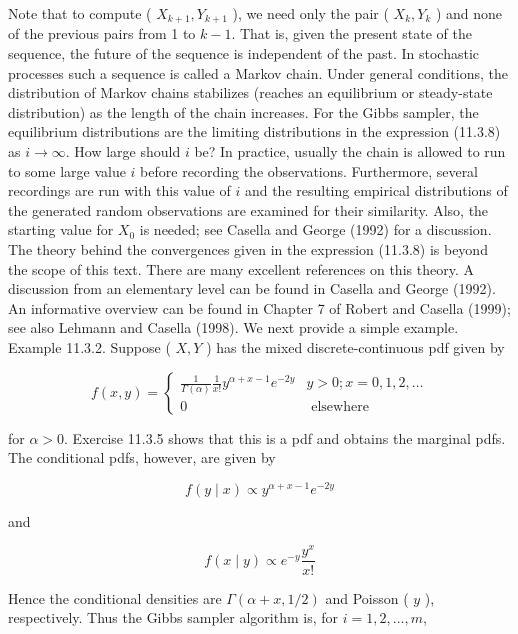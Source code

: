 Note that to compute ( $X_{k+1}, Y_{k+1}$ ), we need only the pair ( $X_{k}, Y_{k}$ ) and none of the previous pairs from 1 to $k-1$. That is, given the present state of the sequence, the future of the sequence is independent of the past. In stochastic processes such a sequence is called a Markov chain. Under general conditions, the distribution of Markov chains stabilizes (reaches an equilibrium or steady-state distribution) as the length of the chain increases. For the Gibbs sampler, the equilibrium distributions are the limiting distributions in the expression (11.3.8) as $i \rightarrow \infty$. How large should $i$ be? In practice, usually the chain is allowed to run to some large value $i$ before recording the observations. Furthermore, several recordings are run with this value of $i$ and the resulting empirical distributions of the generated random observations are examined for their similarity. Also, the starting value for $X_{0}$ is needed; see Casella and George (1992) for a discussion. The theory behind the convergences given in the expression (11.3.8) is beyond the scope of this text. There are many excellent references on this theory. A discussion from an elementary level can be found in Casella and George (1992). An informative overview can be found in Chapter 7 of Robert and Casella (1999); see also Lehmann and Casella (1998). We next provide a simple example.\\
Example 11.3.2. Suppose ( $X, Y$ ) has the mixed discrete-continuous pdf given by

\[
f(x, y)= \begin{cases}\frac{1}{\Gamma(\alpha)} \frac{1}{x!} y^{\alpha+x-1} e^{-2 y} & y>0 ; x=0,1,2, \ldots  \tag{11.3.10}\\ 0 & \text { elsewhere }\end{cases}
\]

for $\alpha>0$. Exercise 11.3.5 shows that this is a pdf and obtains the marginal pdfs. The conditional pdfs, however, are given by


\begin{equation*}
f(y \mid x) \propto y^{\alpha+x-1} e^{-2 y} \tag{11.3.11}
\end{equation*}


and


\begin{equation*}
f(x \mid y) \propto e^{-y} \frac{y^{x}}{x!} \tag{11.3.12}
\end{equation*}


Hence the conditional densities are $\Gamma(\alpha+x, 1 / 2)$ and Poisson ( $y$ ), respectively. Thus the Gibbs sampler algorithm is, for $i=1,2, \ldots, m$,

